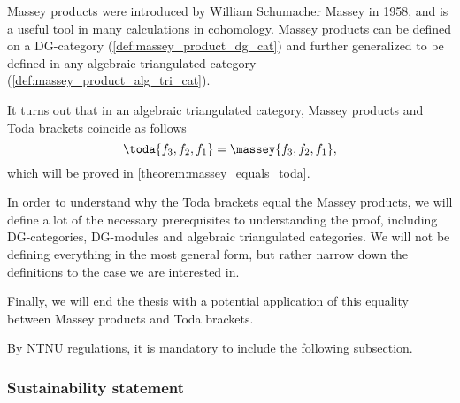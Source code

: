 Massey products were introduced by William Schumacher Massey in 1958, and is a useful tool in many calculations in cohomology. Massey products can be defined on a DG-category (\autoref{def:massey_product_dg_cat}) and further generalized to be defined in any algebraic triangulated category (\autoref{def:massey_product_alg_tri_cat}).

It turns out that in an algebraic triangulated category, Massey products and Toda brackets coincide as follows
\[
    \toda{f_3, f_2, f_1} = \massey{f_3, f_2, f_1},
\]
which will be proved in \autoref{theorem:massey_equals_toda}.

In order to understand why the Toda brackets equal the Massey products, we will define a lot of the necessary prerequisites to understanding the proof, including DG-categories, DG-modules and algebraic triangulated categories. We will not be defining everything in the most general form, but rather narrow down the definitions to the case we are interested in.

Finally, we will end the thesis with a potential application of this equality between Massey products and Toda brackets.

By NTNU regulations, it is mandatory to include the following subsection.
\subsubsection{Sustainability statement}

